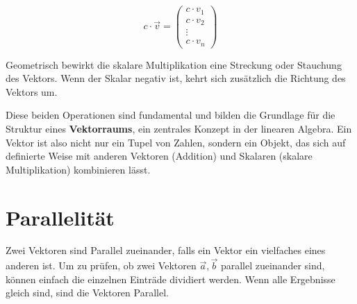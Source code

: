 \begin{enumerate}
          \[
              c \cdot \vec{v} = \begin{pmatrix} c \cdot v_1 \\ c \cdot v_2 \\ \vdots \\ c \cdot v_n \end{pmatrix}
          \]

          Geometrisch bewirkt die skalare Multiplikation eine Streckung oder Stauchung
          des Vektors. Wenn der Skalar negativ ist, kehrt sich zusätzlich die Richtung
          des Vektors um.

\end{enumerate}

Diese beiden Operationen sind fundamental und bilden die Grundlage für die
Struktur eines \textbf{Vektorraums}, ein zentrales Konzept in der linearen
Algebra. Ein Vektor ist also nicht nur ein Tupel von Zahlen, sondern ein
Objekt, das sich auf definierte Weise mit anderen Vektoren (Addition) und
Skalaren (skalare Multiplikation) kombinieren lässt.

\section{Parallelität}

Zwei Vektoren sind Parallel zueinander, falls ein Vektor ein vielfaches eines
anderen ist. Um zu prüfen, ob zwei Vektoren $\vec{a}, \vec{b}$ parallel
zueinander sind, können einfach die einzelnen Einträde dividiert werden. Wenn
alle Ergebnisse gleich sind, sind die Vektoren Parallel.